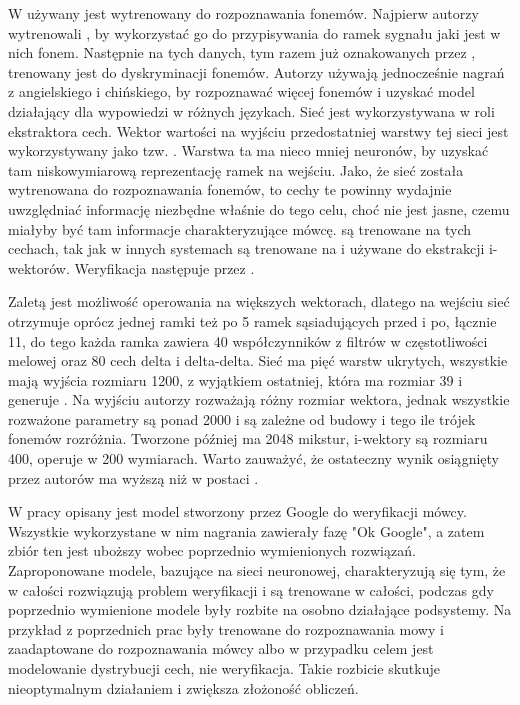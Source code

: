 W \cite{investigationOfBottleneck}
używany jest  wytrenowany do rozpoznawania fonemów. Najpierw autorzy wytrenowali
, by wykorzystać go do przypisywania do ramek sygnału jaki
jest w nich fonem. Następnie na tych danych, tym razem już oznakowanych przez ,
trenowany jest  do dyskryminacji fonemów. Autorzy używają
jednocześnie nagrań z angielskiego i chińskiego, by rozpoznawać więcej fonemów i uzyskać model działający
dla wypowiedzi w różnych językach.
Sieć jest wykorzystywana w roli ekstraktora cech. Wektor wartości na wyjściu przedostatniej warstwy
tej sieci jest wykorzystywany jako tzw. .
Warstwa ta ma nieco mniej neuronów, by uzyskać tam niskowymiarową reprezentację ramek na wejściu.
Jako, że sieć została wytrenowana do rozpoznawania fonemów, to cechy te powinny
wydajnie uwzględniać informację niezbędne właśnie do tego celu, choć nie jest jasne, czemu miałyby być
tam informacje charakteryzujące mówcę.
 są trenowane na tych cechach, tak jak w innych systemach są trenowane na 
i używane do ekstrakcji i-wektorów. Weryfikacja następuje przez .

Zaletą  jest możliwość operowania na większych wektorach, dlatego na wejściu sieć otrzymuje
oprócz jednej ramki też po 5 ramek sąsiadujących przed i po, łącznie 11,
do tego każda ramka zawiera 40 współczynników z filtrów w częstotliwości melowej oraz 80 cech delta i delta-delta.
Sieć ma pięć warstw ukrytych, wszystkie mają wyjścia rozmiaru 1200, z wyjątkiem
ostatniej, która ma rozmiar 39 i generuje . Na wyjściu autorzy rozważają
różny rozmiar wektora, jednak wszystkie rozważone parametry są ponad 2000 i są zależne
od budowy  i tego ile trójek fonemów rozróżnia. Tworzone później
 ma 2048 mikstur, i-wektory są rozmiaru 400,  operuje w 200 wymiarach.
Warto zauważyć, że ostateczny wynik osiągnięty przez autorów ma wyższą  niż 
w postaci .

W pracy \cite{endToEnd} opisany jest model stworzony przez Google do weryfikacji mówcy. Wszystkie wykorzystane
w nim nagrania zawierały fazę "Ok Google", a zatem zbiór ten jest uboższy wobec poprzednio wymienionych rozwiązań.
Zaproponowane modele, bazujące na sieci neuronowej, charakteryzują się tym, że w całości rozwiązują problem weryfikacji
i są trenowane w całości, podczas gdy poprzednio wymienione modele były rozbite na osobno działające podsystemy.
Na przykład  z poprzednich prac były trenowane do rozpoznawania mowy i zaadaptowane do rozpoznawania
mówcy albo w przypadku  celem jest modelowanie dystrybucji cech, nie weryfikacja. Takie rozbicie
skutkuje nieoptymalnym działaniem i zwiększa złożoność obliczeń.

